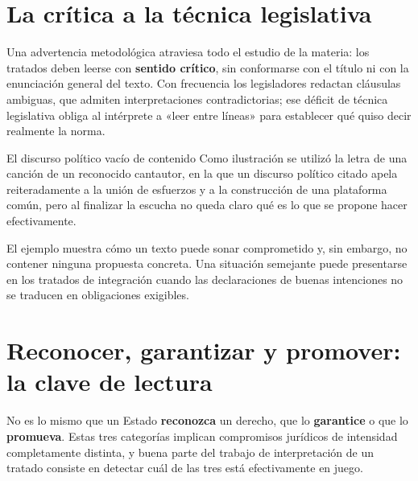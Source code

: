 \documentclass[12pt,oneside]{book}
\begin{document}
\section{La crítica a la técnica legislativa}

Una advertencia metodológica atraviesa todo el estudio de la materia: los tratados deben leerse con \textbf{sentido crítico}, sin conformarse con el título ni con la enunciación general del texto. Con frecuencia los legisladores redactan cláusulas ambiguas, que admiten interpretaciones contradictorias; ese déficit de técnica legislativa obliga al intérprete a «leer entre líneas» para establecer qué quiso decir realmente la norma.

\begin{example}{El discurso político vacío de contenido}
Como ilustración se utilizó la letra de una canción de un reconocido cantautor, en la que un discurso político citado apela reiteradamente a la unión de esfuerzos y a la construcción de una plataforma común, pero al finalizar la escucha no queda claro qué es lo que se propone hacer efectivamente.

El ejemplo muestra cómo un texto puede sonar comprometido y, sin embargo, no contener ninguna propuesta concreta. Una situación semejante puede presentarse en los tratados de integración cuando las declaraciones de buenas intenciones no se traducen en obligaciones exigibles.
\end{example}

\section{Reconocer, garantizar y promover: la clave de lectura}

\begin{important}
No es lo mismo que un Estado \textbf{reconozca} un derecho, que lo \textbf{garantice} o que lo \textbf{promueva}. Estas tres categorías implican compromisos jurídicos de intensidad completamente distinta, y buena parte del trabajo de interpretación de un tratado consiste en detectar cuál de las tres está efectivamente en juego.
\end{important}

\end{document}
